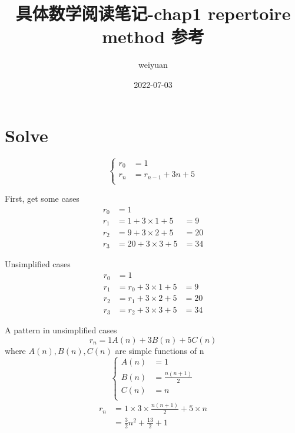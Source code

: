 
\title{具体数学阅读笔记-chap1 repertoire method 参考}
\author{weiyuan}
\date{2022-07-03}

\maketitle
\section{Solve}
\begin{equation*}
    \left\{
        \begin{array}{ll}
            r_0 &= 1\\
            r_n &= r_{n-1}+3n+5\\ 
        \end{array}
    \right.
\end{equation*}

First, get some cases
\begin{align*}
    r_0 &= 1 & \\
    r_1 &= 1+3\times 1 + 5 &= 9  \\
    r_2 &= 9+3\times 2 + 5 &= 20 \\
    r_3 &= 20+3\times 3 + 5 &= 34 
\end{align*}

Unsimplified cases
\begin{align*}
    r_0 &= 1 & \\
    r_1 &= r_0+3\times 1 + 5 &= 9  \\
    r_2 &= r_1+3\times 2 + 5 &= 20 \\
    r_3 &= r_2+3\times 3 + 5 &= 34 
\end{align*}

A pattern in unsimplified cases
\begin{equation*}
    r_n = 1 A(n) + 3 B(n) +5 C(n)
\end{equation*}
where $ A(n), B(n), C(n) $ are simple functions of n
\begin{equation*}
    \left\{
        \begin{array}{ll}
            A(n) &= 1\\
            B(n) &= \frac{n(n+1)}{2}\\
            C(n) &= n\\
        \end{array}
    \right.
\end{equation*}
\begin{align*}
    r_n &= 1 \times 3 \times \frac{n(n+1)}{2} +5 \times n\\
        &= \frac{3}{2}n^2 +\frac{13}{2}+1
\end{align*}

